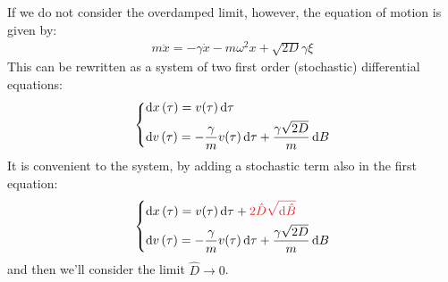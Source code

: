 \documentclass[../template.tex]{subfiles}
\begin{document}
If we do not consider the overdamped limit, however, the equation of motion is given by:
\begin{align*}
    m\ddot{x} = - \gamma \dot{x} - m \omega^2 x + \sqrt{2D} \gamma \xi
\end{align*}
This can be rewritten as a system of two first order (stochastic) differential equations:
\begin{align*}
    \begin{dcases}
        \dd{x}(\tau) = v(\tau) \dd{\tau} \\
        \dd{v}(\tau) = -\frac{\gamma}{m} v(\tau) \dd{\tau} + \frac{\gamma \sqrt{2D}}{m} \dd{B}    
    \end{dcases}
\end{align*}
It is convenient to  the system, by adding a stochastic term also in the first equation:
\begin{align*}
    \begin{dcases}
        \dd{x}(\tau) = v(\tau) \dd{\tau} + \textcolor{Red}{2 \hat{D}\sqrt{\dd{\hat{B}}}}\\
        \dd{v}(\tau) = -\frac{\gamma}{m} v(\tau) \dd{\tau} + \frac{\gamma \sqrt{2D}}{m} \dd{B}  
    \end{dcases}
\end{align*}
and then we'll consider the limit $\hat{D} \to 0$.
\end{document}
